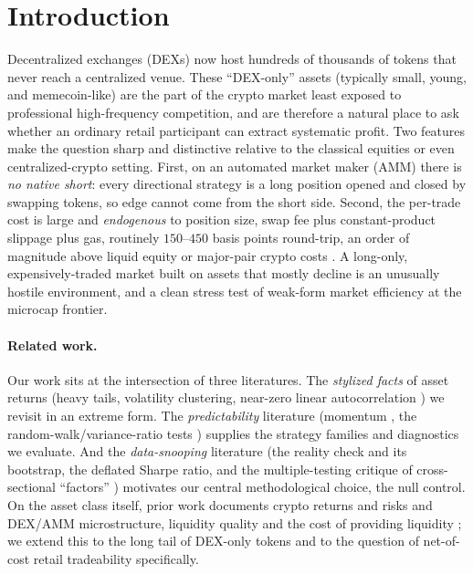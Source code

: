 \documentclass[12pt]{article}
\begin{document}
\tableofcontents
\bigskip

\section{Introduction}
Decentralized exchanges (DEXs) now host hundreds of thousands of tokens that never reach a centralized venue. These ``DEX-only'' assets (typically small, young, and memecoin-like) are the part of the crypto market least exposed to professional high-frequency competition, and are therefore a natural place to ask whether an ordinary retail participant can extract systematic profit. Two features make the question sharp and distinctive relative to the classical equities or even centralized-crypto setting. First, on an automated market maker (AMM) there is \emph{no native short}: every directional strategy is a long position opened and closed by swapping tokens, so edge cannot come from the short side. Second, the per-trade cost is large and \emph{endogenous} to position size, swap fee plus constant-product slippage plus gas, routinely $150$--$450$ basis points round-trip, an order of magnitude above liquid equity or major-pair crypto costs \cite{makarov2020,barbon2023}. A long-only, expensively-traded market built on assets that mostly decline is an unusually hostile environment, and a clean stress test of weak-form market efficiency \cite{fama1970,fama1965} at the microcap frontier.

\paragraph{Related work.} Our work sits at the intersection of three literatures. The \emph{stylized facts} of asset returns (heavy tails, volatility clustering, near-zero linear autocorrelation \cite{mandelbrot1963,cont2001,engle1982}) we revisit in an extreme form. The \emph{predictability} literature (momentum \cite{jegadeesh1993}, the random-walk/variance-ratio tests \cite{lo1988}) supplies the strategy families and diagnostics we evaluate. And the \emph{data-snooping} literature (the reality check and its bootstrap, the deflated Sharpe ratio, and the multiple-testing critique of cross-sectional ``factors'' \cite{white2000,sullivan1999,bailey2014,harvey2016}) motivates our central methodological choice, the null control. On the asset class itself, prior work documents crypto returns and risks \cite{liu2021} and DEX/AMM microstructure, liquidity quality and the cost of providing liquidity \cite{makarov2020,lehar2021,barbon2023,capponi2021,milionis2022}; we extend this to the long tail of DEX-only tokens and to the question of net-of-cost retail tradeability specifically.
\end{document}
